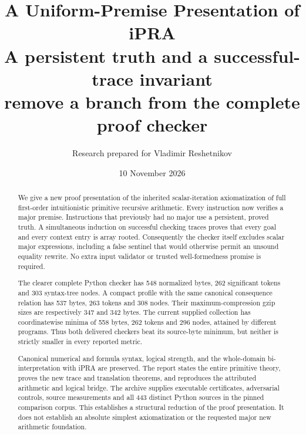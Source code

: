 \documentclass[11pt,letterpaper]{article}
\title{\color{ink}\bfseries A Uniform-Premise Presentation of iPRA\\[8pt]
\large A persistent truth and a successful-trace invariant\\
remove a branch from the complete proof checker}
\author{Research prepared for Vladimir Reshetnikov}
\date{10 November 2026}
\theoremstyle{definition}\newtheorem{definition}[theorem]{Definition}
\theoremstyle{remark}\newtheorem{remark}[theorem]{Remark}
\begin{document}
\maketitle
\begin{abstract}
We give a new proof presentation of the inherited scalar-iteration
axiomatization of full first-order intuitionistic primitive recursive
arithmetic. Every instruction now verifies a major premise. Instructions
that previously had no major use a persistent, proved truth. A simultaneous
induction on successful checking traces proves that every goal and every
context entry is array rooted. Consequently the checker itself excludes
scalar major expressions, including a false sentinel that would otherwise
permit an unsound equality rewrite. No extra input validator or trusted
well-formedness promise is required.

The clearer complete Python checker has 548 normalized bytes, 262
significant tokens and 303 syntax-tree nodes. A compact profile with the
same canonical consequence relation
has 537 bytes, 263 tokens and 308 nodes. Their maximum-compression gzip
sizes are respectively 347 and 342 bytes. The current supplied collection
has coordinatewise minima of 558 bytes, 262 tokens and 296 nodes, attained
by different programs. Thus both delivered checkers beat its source-byte
minimum, but neither is strictly smaller in every reported metric.

Canonical numerical and formula syntax, logical strength, and the
whole-domain bi-interpretation with iPRA are preserved. The report states
the entire primitive theory, proves the new trace and translation
theorems, and reproduces the attributed arithmetic and logical bridge.
The archive supplies executable certificates, adversarial controls,
source measurements and all 443 distinct Python sources in the pinned
comparison corpus. This establishes a structural reduction of the proof
presentation. It does not establish an absolute simplest axiomatization
or the requested major new arithmetic foundation.
\end{abstract}
\begin{center}
\end{center}
\clearpage
\setcounter{tocdepth}{1}\tableofcontents
\clearpage
\end{document}
